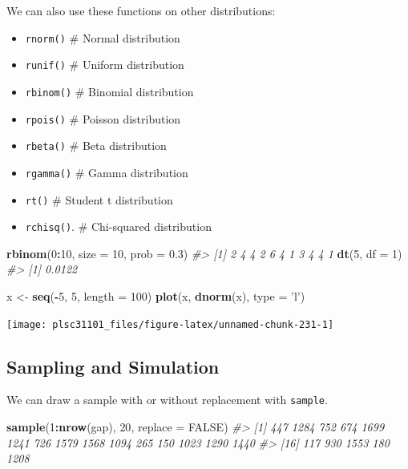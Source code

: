 \documentclass[]{book}
\newenvironment{Shaded}{\begin{snugshade}}{\end{snugshade}}
\newcommand{\KeywordTok}[1]{\textcolor[rgb]{0.13,0.29,0.53}{\textbf{#1}}}
\newcommand{\DataTypeTok}[1]{\textcolor[rgb]{0.13,0.29,0.53}{#1}}
\newcommand{\DecValTok}[1]{\textcolor[rgb]{0.00,0.00,0.81}{#1}}
\newcommand{\FloatTok}[1]{\textcolor[rgb]{0.00,0.00,0.81}{#1}}
\newcommand{\StringTok}[1]{\textcolor[rgb]{0.31,0.60,0.02}{#1}}
\newcommand{\CommentTok}[1]{\textcolor[rgb]{0.56,0.35,0.01}{\textit{#1}}}
\newcommand{\OtherTok}[1]{\textcolor[rgb]{0.56,0.35,0.01}{#1}}
\newcommand{\OperatorTok}[1]{\textcolor[rgb]{0.81,0.36,0.00}{\textbf{#1}}}
\newcommand{\NormalTok}[1]{#1}
\providecommand{\tightlist}{%
  \setlength{\itemsep}{0pt}\setlength{\parskip}{0pt}}
\begin{document}
We can also use these functions on other distributions:

\begin{itemize}
\tightlist
\item
  \texttt{rnorm()} \# Normal distribution
\item
  \texttt{runif()} \# Uniform distribution
\item
  \texttt{rbinom()} \# Binomial distribution
\item
  \texttt{rpois()} \# Poisson distribution
\item
  \texttt{rbeta()} \# Beta distribution
\item
  \texttt{rgamma()} \# Gamma distribution
\item
  \texttt{rt()} \# Student t distribution
\item
  \texttt{rchisq()}. \# Chi-squared distribution
\end{itemize}

\begin{Shaded}
\begin{Highlighting}[]
\KeywordTok{rbinom}\NormalTok{(}\DecValTok{0}\OperatorTok{:}\DecValTok{10}\NormalTok{, }\DataTypeTok{size =} \DecValTok{10}\NormalTok{, }\DataTypeTok{prob =} \FloatTok{0.3}\NormalTok{)}
\CommentTok{#>  [1] 2 4 4 2 6 4 1 3 4 4 1}
\KeywordTok{dt}\NormalTok{(}\DecValTok{5}\NormalTok{, }\DataTypeTok{df =} \DecValTok{1}\NormalTok{)}
\CommentTok{#> [1] 0.0122}

\NormalTok{x <-}\StringTok{ }\KeywordTok{seq}\NormalTok{(}\OperatorTok{-}\DecValTok{5}\NormalTok{, }\DecValTok{5}\NormalTok{, }\DataTypeTok{length =} \DecValTok{100}\NormalTok{)}
\KeywordTok{plot}\NormalTok{(x, }\KeywordTok{dnorm}\NormalTok{(x), }\DataTypeTok{type =} \StringTok{'l'}\NormalTok{)}
\end{Highlighting}
\end{Shaded}

\begin{center}\texttt{[image: plsc31101\_files/figure-latex/unnamed-chunk-231-1]} \end{center}

\subsection{Sampling and Simulation}\label{sampling-and-simulation}

We can draw a sample with or without replacement with \texttt{sample}.

\begin{Shaded}
\begin{Highlighting}[]
\KeywordTok{sample}\NormalTok{(}\DecValTok{1}\OperatorTok{:}\KeywordTok{nrow}\NormalTok{(gap), }\DecValTok{20}\NormalTok{, }\DataTypeTok{replace =} \OtherTok{FALSE}\NormalTok{)}
\CommentTok{#>  [1]  447 1284  752  674 1699 1241  726 1579 1568 1094  265  150 1023 1290 1440}
\CommentTok{#> [16]  117  930 1553  180 1208}
\end{Highlighting}
\end{Shaded}
\end{document}

